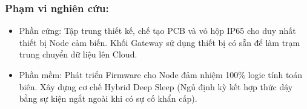 \subsubsection{Phạm vi nghiên cứu:}
\begin{itemize}
    \item Phần cứng: Tập trung thiết kế, chế tạo PCB và vỏ hộp IP65 cho duy nhất thiết bị Node cảm biến. Khối Gateway sử dụng thiết bị có sẵn để làm trạm trung chuyển dữ liệu lên Cloud.
    \item Phần mềm: Phát triển Firmware cho Node đảm nhiệm 100\% logic tính toán biên. Xây dựng cơ chế Hybrid Deep Sleep (Ngủ định kỳ kết hợp thức dậy bằng sự kiện ngắt ngoài khi có sự cố khẩn cấp).
\end{itemize}
